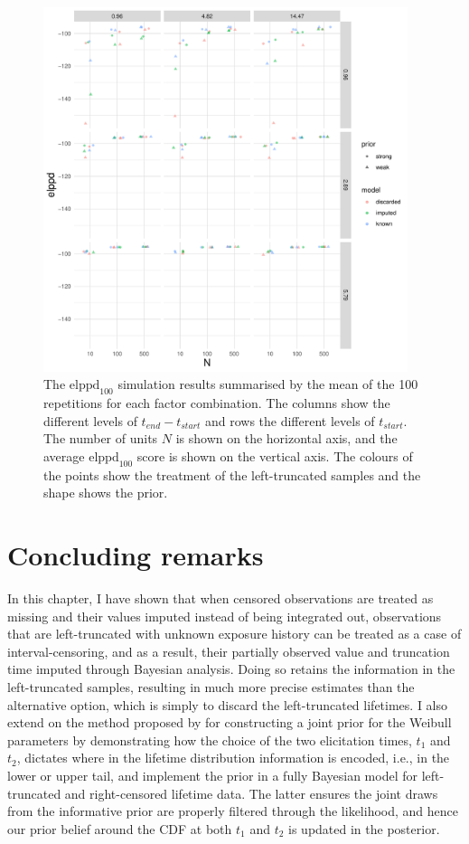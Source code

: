 \begin{figure}[tbp]
    \centering
    \includegraphics[width=0.95\textwidth]{./figures/ch-2/sim-results-elppd.pdf}
    \caption{The $\text{elppd}_{100}$ simulation results summarised by the mean of the 100 repetitions for each factor combination. The columns show the different levels of $t_{end} - t_{start}$ and rows the different levels of $t_{start}$. The number of units $N$ is shown on the horizontal axis, and the average $\text{elppd}_{100}$ score is shown on the vertical axis. The colours of the points show the treatment of the left-truncated samples and the shape shows the prior.}
    \label{fig:sim-study-elppd}
\end{figure}

\section{Concluding remarks} \label{sec:weibull-conclusion}

In this chapter, I have shown that when censored observations are treated as missing and their values imputed instead of being integrated out, observations that are left-truncated with unknown exposure history can be treated as a case of interval-censoring, and as a result, their partially observed value and truncation time imputed through Bayesian analysis. Doing so retains the information in the left-truncated samples, resulting in much more precise estimates than the alternative option, which is simply to discard the left-truncated lifetimes. I also extend on the method proposed by \citet{kaminskiy2005} for constructing a joint prior for the Weibull parameters by demonstrating how the choice of the two elicitation times, $t_1$ and $t_2$, dictates where in the lifetime distribution information is encoded, i.e., in the lower or upper tail, and implement the prior in a fully Bayesian model for left-truncated and right-censored lifetime data. The latter ensures the joint draws from the informative prior are properly filtered through the likelihood, and hence our prior belief around the CDF at both $t_1$ and $t_2$ is updated in the posterior.

